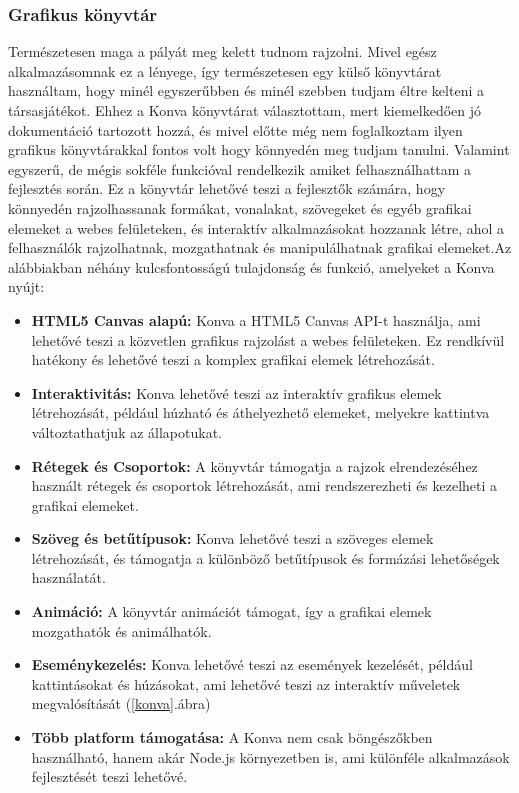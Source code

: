 \documentclass[a4paper,twoside]{article}
\begin{document}
\subsubsection{Grafikus könyvtár}
Természetesen maga a pályát meg kelett tudnom rajzolni. Mivel egész alkalmazásomnak ez a lényege, így természetesen egy külső könyvtárat használtam, hogy minél egyszerűbben és minél szebben tudjam éltre kelteni a társasjátékot. Ehhez a Konva könyvtárat választottam, mert kiemelkedően jó dokumentáció tartozott hozzá, és mivel előtte még nem foglalkoztam ilyen grafikus könyvtárakkal fontos volt hogy könnyedén meg tudjam tanulni. Valamint egyszerű, de mégis sokféle funkcióval rendelkezik amiket felhasználhattam a fejlesztés során. 
Ez a könyvtár lehetővé teszi a fejlesztők számára, hogy könnyedén rajzolhassanak formákat, vonalakat, szövegeket és egyéb grafikai elemeket a webes felületeken, és interaktív alkalmazásokat hozzanak létre, ahol a felhasználók rajzolhatnak, mozgathatnak és manipulálhatnak grafikai elemeket.Az alábbiakban néhány kulcsfontosságú tulajdonság és funkció, amelyeket a Konva nyújt:
\begin{itemize}
	\item \textbf{HTML5 Canvas alapú:} Konva a HTML5 Canvas API-t használja, ami lehetővé teszi a közvetlen grafikus rajzolást a webes felületeken. Ez rendkívül hatékony és lehetővé teszi a komplex grafikai elemek létrehozását.
	\item \textbf{Interaktivitás:} Konva lehetővé teszi az interaktív grafikus elemek létrehozását, például húzható és áthelyezhető elemeket, melyekre kattintva változtathatjuk az állapotukat.
	\item \textbf{Rétegek és Csoportok:} A könyvtár támogatja a rajzok elrendezéséhez használt rétegek és csoportok létrehozását, ami rendszerezheti és kezelheti a grafikai elemeket.
	\item \textbf{Szöveg és betűtípusok:} Konva lehetővé teszi a szöveges elemek létrehozását, és támogatja a különböző betűtípusok és formázási lehetőségek használatát.
	\item \textbf{Animáció:} A könyvtár animációt támogat, így a grafikai elemek mozgathatók és animálhatók.
	\item \textbf{Eseménykezelés:} Konva lehetővé teszi az események kezelését, például kattintásokat és húzásokat, ami lehetővé teszi az interaktív műveletek megvalósítását (\ref{konva}.ábra)
	\item \textbf{Több platform támogatása:} A Konva nem csak böngészőkben használható, hanem akár Node.js környezetben is, ami különféle alkalmazások fejlesztését teszi lehetővé.
\end{itemize}
\end{document}
